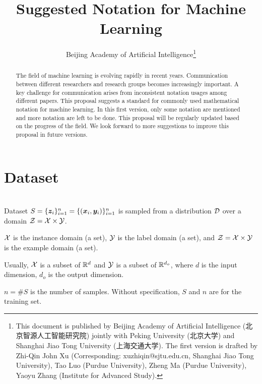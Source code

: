 \documentclass{article}
\begin{document}
\title{Suggested Notation for Machine Learning}
\author{Beijing Academy of Artificial Intelligence\thanks{This document is published by Beijing Academy of Artificial Intelligence  (北京智源人工智能研究院)  jointly with Peking University (北京大学) and Shanghai Jiao Tong University (上海交通大学). The first version is drafted by Zhi-Qin John Xu (Corresponding: xuzhiqin@sjtu.edu.cn, Shanghai Jiao Tong University), Tao Luo (Purdue University), Zheng Ma (Purdue University), Yaoyu Zhang (Institute for Advanced Study).}}


\maketitle 
\begin{abstract}
The field of machine learning is evolving rapidly in recent years. Communication between different researchers and research groups becomes increasingly important. A key challenge for communication arises from inconsistent notation usages among different papers. This proposal suggests a standard for commonly used mathematical notation for machine learning. In this first version, only some notation are mentioned and more notation are left to be done. This proposal will be regularly updated based on the progress of the field. We look forward to more suggestions to improve this proposal in future versions.
\end{abstract}

\tableofcontents

\section{Dataset}~\\
Dataset  $S=\{\bm{z}_i\}_{i=1}^n=\{(\bm{x}_i,\bm{y}_i)\}_{i=1}^n$ is sampled from a distribution $\mathcal{D}$ over a domain $\mathcal{Z}=\mathcal{X}\times\mathcal{Y}$. 

$\mathcal{X}$  is the instance domain (a set), $\mathcal{Y}$ is the label domain (a set), and $\mathcal{Z}=\mathcal{X}\times\mathcal{Y}$ is the example domain (a set). 

Usually, 
$\mathcal{X}$ is a subset of $\mathbb{R}^d$ and $\mathcal{Y}$ is a subset of $\mathbb{R}^{d_{o}}$, where $d$ is the input dimension, $d_{o}$ is the output dimension.

$n=\#S$ is the number of samples. Without specification, $S$ and $n$ are for the training set.
\end{document}
